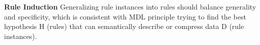 






%

\textbf{Rule Induction}
Generalizing rule instances into rules should balance generality and specificity, which is consistent with MDL principle trying to find the best hypothesis H (rules) that can semantically describe or compress data D (rule instances).
 
